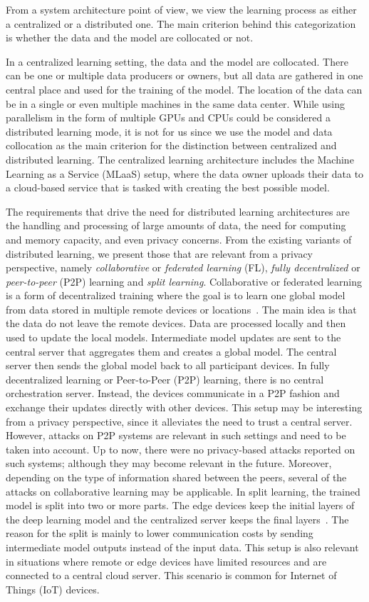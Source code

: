 From a system architecture point of view, we view the learning process as either a centralized or a distributed one. The main criterion behind this categorization is whether the data and the model are collocated or not.

In a centralized learning setting, the data and the model are collocated. There can be one or multiple data producers or owners, but all data are gathered in one central place and used for the training of the model. The location of the data can be in a single or even multiple machines in the same data center. While using parallelism in the form of multiple GPUs and CPUs could be considered a distributed learning mode, it is not for us since we use the model and data collocation as the main criterion for the distinction between centralized and distributed learning. The centralized learning architecture includes the Machine Learning as a Service (MLaaS) setup, where the data owner uploads their data to a cloud-based service that is tasked with creating the best possible model.

The requirements that drive the need for distributed learning architectures are the handling and processing of large amounts of data, the need for computing and memory capacity, and even privacy concerns. From the existing variants of distributed learning, we present those that are relevant from a privacy perspective, namely \textit{collaborative} or \textit{federated learning} (FL), \textit{fully decentralized} or \textit{peer-to-peer} (P2P) learning and \textit{split learning}.
Collaborative or federated learning is a form of decentralized training where the goal is to learn one global model from data stored in multiple remote devices or locations~. The main idea is that the data do not leave the remote devices. Data are processed locally and then used to update the local models. Intermediate model updates are sent to the central server that aggregates them and creates a global model. The central server then sends the global model back to all participant devices.
In fully decentralized learning or Peer-to-Peer (P2P) learning, there is no central orchestration server. Instead, the devices communicate in a P2P fashion and exchange their updates directly with other devices. This setup may be interesting from a privacy perspective, since it alleviates the need to trust a central server. However, attacks on P2P systems are relevant in such settings and need to be taken into account. Up to now, there were no privacy-based attacks reported on such systems; although they may become relevant in the future. Moreover, depending on the type of information shared between the peers, several of the attacks on collaborative learning may be applicable.
In split learning, the trained model is split into two or more parts. The edge devices keep the initial layers of the deep learning model and the centralized server keeps the final layers~. The reason for the split is mainly to lower communication costs by sending intermediate model outputs instead of the input data. This setup is also relevant in situations where remote or edge devices have limited resources and are connected to a central cloud server. This scenario is common for Internet of Things (IoT) devices.

